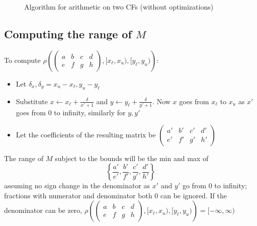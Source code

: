 \documentclass[11pt, oneside]{amsart}   	%
\newcommand{\bihomographic}[8]{\left(\begin{smallmatrix}#1&#2&#3&#4\\#5&#6&#7&#8\end{smallmatrix}\right)}
\newcommand{\abcd}{\left(
\begin{smallmatrix} 
a & b & c & d\\ 
e & f & g & h
\end{smallmatrix}
\right)}
\renewcommand{\:}{\negthickspace:\negthickspace}
\begin{document}
\begin{figure}\label{fig:twoCFarith}
\begin{algorithmic}
\STATE{}
\STATE{}
\STATE{}
 
 
 
    \STATE{}
     \IF{$x_i = [a,a+1)$ (where $a$ is an integer)} 
         \STATE{$I_x \gets [1,\infty)$}
     \ELSE    
     \ENDIF
          \IF{$y_i = [a,a+1)$ (where $a$ is an integer)} 
         \STATE{$I_y \gets [1,\infty)$}
     \ELSE    
     \ENDIF
     
     \STATE{}
          \STATE{$z_j \gets [a,a+1)$}    
     \ELSE
     \ENDIF
\ENDWHILE
\end{algorithmic}
\caption{Algorithm for arithmetic on two CFs (without optimizations)}
\end{figure}


\subsection{Computing the range of $M$}\label{sec:ComputeBounds}
To compute $\rho\left(\abcd, [x_{\ell}, x_u),  [y_{\ell}, y_u)\right)$:
\begin{itemize}
\item Let $\delta_x, \delta_y = x_u - x_{\ell}, y_u - y_{\ell}$
\item Substitute $x \leftarrow x_{\ell} + \frac{\delta}{x'+1}$ and $y \leftarrow y_{\ell} + \frac{\delta}{y'+1}$.
Now $x$ goes from $x_{\ell}$ to $x_u$ as $x'$ goes from 0 to infinity, similarly for $y,y'$
\item Let the coefficients of the resulting matrix be $\bihomographic{a'}{b'}{c'}{d'}{e'}{f'}{g'}{h'}$
\end{itemize}
The range of $M$ subject to the bounds will be the min and max of 
\[
\left\{ \frac{a'}{e'},\frac{b'}{f'},\frac{c'}{g'},\frac{d'}{h'} \right\}
\]
assuming no sign change in the denominator as $x'$ and $y'$ go from 0 to infinity; fractions with numerator and denominator both $0$ can be ignored.
If the denominator can be zero, $\rho\left(\abcd, [x_{\ell}, x_u),  [y_{\ell}, y_u)\right) = [-\infty,\infty)$
\end{document}
